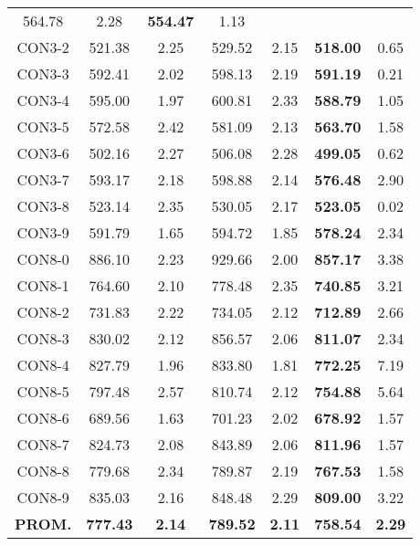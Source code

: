 \begin{table}[ht]
\begin{tabular}{c c c c c c c}
564.78 & 2.28 & \bf{554.47} & 
1.13\\CON3-2 & 521.38 & 2.25 & 
529.52 & 2.15 & \bf{518.00} & 
0.65\\CON3-3 & 592.41 & 2.02 & 
598.13 & 2.19 & \bf{591.19} & 
0.21\\CON3-4 & 595.00 & 1.97 & 
600.81 & 2.33 & \bf{588.79} & 
1.05\\CON3-5 & 572.58 & 2.42 & 
581.09 & 2.13 & \bf{563.70} & 
1.58\\CON3-6 & 502.16 & 2.27 & 
506.08 & 2.28 & \bf{499.05} & 
0.62\\CON3-7 & 593.17 & 2.18 & 
598.88 & 2.14 & \bf{576.48} & 
2.90\\CON3-8 & 523.14 & 2.35 & 
530.05 & 2.17 & \bf{523.05} & 
0.02\\CON3-9 & 591.79 & 1.65 & 
594.72 & 1.85 & \bf{578.24} & 
2.34\\CON8-0 & 886.10 & 2.23 & 
929.66 & 2.00 & \bf{857.17} & 
3.38\\CON8-1 & 764.60 & 2.10 & 
778.48 & 2.35 & \bf{740.85} & 
3.21\\CON8-2 & 731.83 & 2.22 & 
734.05 & 2.12 & \bf{712.89} & 
2.66\\CON8-3 & 830.02 & 2.12 & 
856.57 & 2.06 & \bf{811.07} & 
2.34\\CON8-4 & 827.79 & 1.96 & 
833.80 & 1.81 & \bf{772.25} & 
7.19\\CON8-5 & 797.48 & 2.57 & 
810.74 & 2.12 & \bf{754.88} & 
5.64\\CON8-6 & 689.56 & 1.63 & 
701.23 & 2.02 & \bf{678.92} & 
1.57\\CON8-7 & 824.73 & 2.08 & 
843.89 & 2.06 & \bf{811.96} & 
1.57\\CON8-8 & 779.68 & 2.34 & 
789.87 & 2.19 & \bf{767.53} & 
1.58\\CON8-9 & 835.03 & 2.16 & 
848.48 & 2.29 & \bf{809.00} & 
3.22\\\bf{PROM.} & 
\bf{777.43} & \bf{2.14} & \bf{789.52} & \bf{2.11} & \bf{758.54} & \bf{2.29}\\[1ex]\hline
\end{tabular}
\label{table:nonlin}
\end{table} \clearpage
